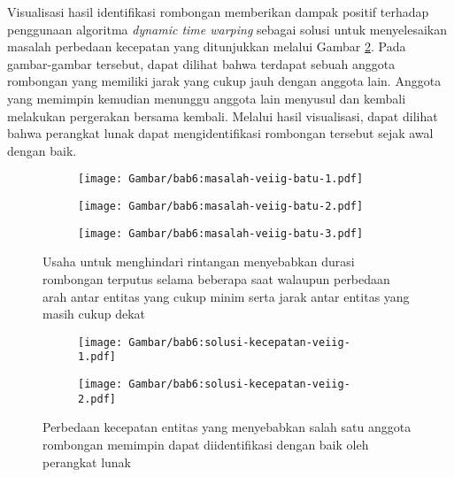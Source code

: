 Visualisasi hasil identifikasi rombongan memberikan dampak positif terhadap penggunaan algoritma \textit{dynamic time warping} sebagai solusi untuk menyelesaikan masalah perbedaan kecepatan yang ditunjukkan melalui Gambar \ref{bab6:solusi-beda-kecepatan-veiig}. Pada gambar-gambar tersebut, dapat dilihat bahwa terdapat sebuah anggota rombongan yang memiliki jarak yang cukup jauh dengan anggota lain. Anggota yang memimpin kemudian menunggu anggota lain menyusul dan kembali melakukan pergerakan bersama kembali. Melalui hasil visualisasi, dapat dilihat bahwa perangkat lunak dapat mengidentifikasi rombongan tersebut sejak awal dengan baik.

\begin{figure}[t!]
    \centering
    \captionsetup{width=.8\textwidth}
    \begin{subfigure}[t]{0.25\textwidth}
        \centering
        \texttt{[image: Gambar/bab6:masalah-veiig-batu-1.pdf]}
    \end{subfigure}
    \begin{subfigure}[t]{0.275\textwidth}
        \centering
        \texttt{[image: Gambar/bab6:masalah-veiig-batu-2.pdf]}
    \end{subfigure}
    \begin{subfigure}[t]{0.25\textwidth}
        \centering
        \texttt{[image: Gambar/bab6:masalah-veiig-batu-3.pdf]}
    \end{subfigure}
    \caption[Masalah menghindari rintangan]{Usaha untuk menghindari rintangan menyebabkan durasi rombongan terputus selama beberapa saat walaupun perbedaan arah antar entitas yang cukup minim serta jarak antar entitas yang masih cukup dekat}
    \label{bab6:masalah-rintangan-veiig}
\end{figure}

\begin{figure}[t!]
    \centering
    \captionsetup{width=.7\textwidth}
    \begin{subfigure}[b]{0.265\textwidth}
        \centering
        \texttt{[image: Gambar/bab6:solusi-kecepatan-veiig-1.pdf]}
    \end{subfigure}
    \begin{subfigure}[b]{0.265\textwidth}
        \centering
        \texttt{[image: Gambar/bab6:solusi-kecepatan-veiig-2.pdf]}
    \end{subfigure}
    \caption[Penyelesaian masalah beda kecepatan pada data VEIIG]{Perbedaan kecepatan entitas yang menyebabkan salah satu anggota rombongan memimpin dapat diidentifikasi dengan baik oleh perangkat lunak}
    \label{bab6:solusi-beda-kecepatan-veiig}
\end{figure}


